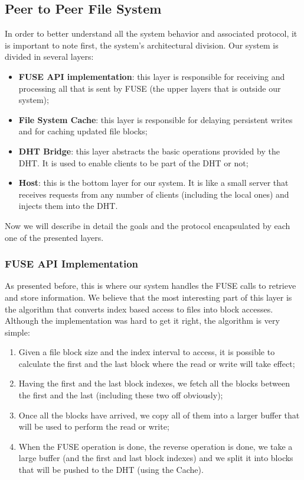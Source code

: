 \documentclass[times,9pt,article]{llncs}
\begin{document}
\subsection{Peer to Peer File System}
In order to better understand all the system behavior and associated protocol, it is important  to note first, the system's architectural division. Our system is divided in several layers:

\begin{itemize}
\item \textbf{FUSE API implementation}: this layer is responsible for receiving and processing all that is sent by FUSE (the upper layers that is outside our system);
\item \textbf{File System Cache}: this layer is responsible for delaying persistent writes and for caching updated file blocks;
\item \textbf{DHT Bridge}: this layer abstracts the basic operations provided by the DHT. It is used to enable clients to be part of the DHT or not;
\item \textbf{Host}: this is the bottom layer for our system. It is like a small server that receives requests from any number of clients (including the local ones) and injects them into the DHT.
\end{itemize}

Now we will describe in detail the goals and the protocol encapsulated by each one of the presented layers.

\subsubsection{FUSE API Implementation}

As presented before, this is where our system handles the FUSE calls to retrieve and store information. We believe that the most interesting part of this layer is the algorithm that converts index based access to files into block accesses. Although the implementation was hard to get it right, the algorithm is very simple:

\begin{enumerate}
\item Given a file block size and the index interval to access, it is possible to calculate the first and the last block where the read or write will take effect;
\item Having the first and the last block indexes, we fetch all the blocks between the first and the last (including these two off obviously);
\item Once all the blocks have arrived, we copy all of them into a larger buffer that will be used to perform the read or write;
\item When the FUSE operation is done, the reverse operation is done, we take a large buffer (and the first and last block indexes) and we split it into blocks that will be pushed to the DHT (using the Cache).
\end{enumerate}
\end{document}
